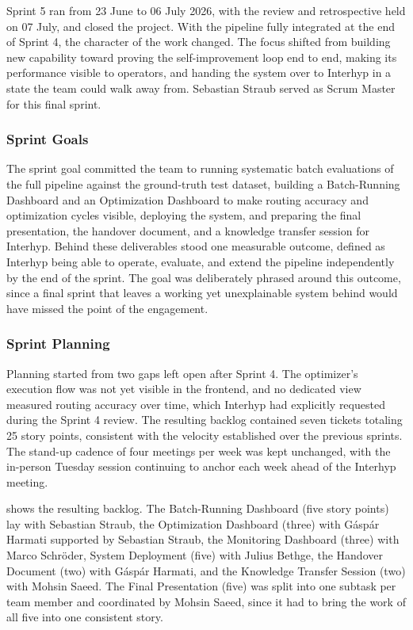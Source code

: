 \label{sec:sprint5}

Sprint 5 ran from 23 June to 06 July 2026, with the review and retrospective held on 07 July, and closed the project. With the pipeline fully integrated at the end of Sprint 4, the character of the work changed. The focus shifted from building new capability toward proving the self-improvement loop end to end, making its performance visible to operators, and handing the system over to Interhyp in a state the team could walk away from. Sebastian Straub served as Scrum Master for this final sprint.

\subsubsection{Sprint Goals}\label{sec:sprint5-goals}

The sprint goal committed the team to running systematic batch evaluations of the full pipeline against the ground-truth test dataset, building a Batch-Running Dashboard and an Optimization Dashboard to make routing accuracy and optimization cycles visible, deploying the system, and preparing the final presentation, the handover document, and a knowledge transfer session for Interhyp. Behind these deliverables stood one measurable outcome, defined as Interhyp being able to operate, evaluate, and extend the pipeline independently by the end of the sprint. The goal was deliberately phrased around this outcome, since a final sprint that leaves a working yet unexplainable system behind would have missed the point of the engagement.

\subsubsection{Sprint Planning}\label{sec:sprint5-planning}

Planning started from two gaps left open after Sprint 4. The optimizer's execution flow was not yet visible in the frontend, and no dedicated view measured routing accuracy over time, which Interhyp had explicitly requested during the Sprint 4 review. The resulting backlog contained seven tickets totaling 25 story points, consistent with the velocity established over the previous sprints. The stand-up cadence of four meetings per week was kept unchanged, with the in-person Tuesday session continuing to anchor each week ahead of the Interhyp meeting.

 shows the resulting backlog. The Batch-Running Dashboard (five story points) lay with Sebastian Straub, the Optimization Dashboard (three) with Gáspár Harmati supported by Sebastian Straub, the Monitoring Dashboard (three) with Marco Schröder, System Deployment (five) with Julius Bethge, the Handover Document (two) with Gáspár Harmati, and the Knowledge Transfer Session (two) with Mohsin Saeed. The Final Presentation (five) was split into one subtask per team member and coordinated by Mohsin Saeed, since it had to bring the work of all five into one consistent story.

